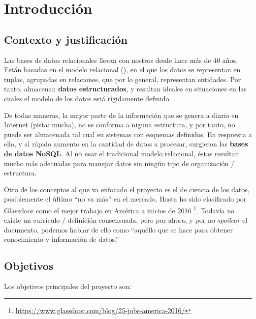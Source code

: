 \section{Introducción}
\label{sec:aim}

\subsection{Contexto y justificación}
\label{subsec:context}

Las bases de datos relacionales llevan con nostros desde hace más de 40 años.
Están basadas en el modelo relacional (\cite{Codd:1970:RMD:362384.362685}), en el que los datos se representan en tuplas, agrupadas en
relaciones, que por lo general, representan entidades. Por tanto, almacenan
\textbf{datos estructurados}, y resultan ideales en situaciones en las cuales el
modelo de los datos está rígidamente definido.

De todas maneras, la mayor parte de la información que se genera a
diario en Internet (pista: mucha), no se conforma a niguna estructura, y
por tanto, no puede ser almacenada tal cual en sistemas con esquemas definidos.
En respuesta a ello, y al rápido aumento en la cantidad de datos a procesar,
surgieron las \textbf{bases de datos NoSQL}. Al no usar el tradicional modelo
relacional, éstas resultan mucho más adecuadas para manejar datos sin ningún
tipo de organización / estructura. 

Otro de los conceptos al que va enfocado el proyecto es el de ciencia de los
datos, posiblemente el último ``no va más'' en el mercado. Hasta ha sido
clasificado por Glassdoor como el mejor trabajo en América a inicios de 2016
\footnote{\url{https://www.glassdoor.com/blog/25-jobs-america-2016/}}. Todavía
no existe un currículo / definición consensuada, pero por ahora, y por no
\emph{spoilear} el documento, podemos hablar de ello como ``aquéllo que se hace
para obtener conocimiento y información de datos.''


\subsection{Objetivos}
\label{subsec:objectives}

Los objetivos principales del proyecto son:


